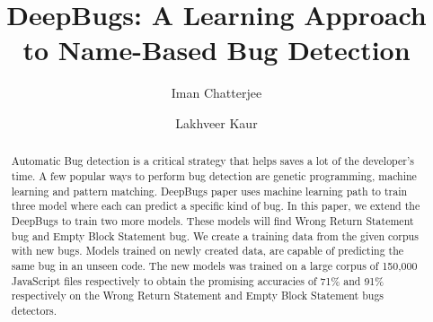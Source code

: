 \documentclass[sigconf]{acmart}
\begin{document}
\title{DeepBugs: A Learning Approach to Name-Based Bug Detection}

\author{Iman Chatterjee}

\author{Lakhveer Kaur}





\renewcommand{\shortauthors}{Trovato and Tobin, et al.}

\begin{abstract}
Automatic Bug detection is a critical strategy that helps saves a lot of the developer's time. A few popular ways to perform bug detection are genetic programming, machine learning and pattern matching. DeepBugs paper uses machine learning path to train three model where each can predict a specific kind of bug. In this paper, we extend the DeepBugs to train two more models. These models will find Wrong Return Statement bug and Empty Block Statement bug. We create a training data from the given corpus with new bugs. Models trained on newly created data, are capable of predicting the same bug in an unseen code. The new models was trained on a large corpus of 150,000 JavaScript files respectively to obtain the promising accuracies of 71\% and 91\% respectively on the Wrong Return Statement and Empty Block Statement bugs detectors.
\end{abstract}
\end{document}
